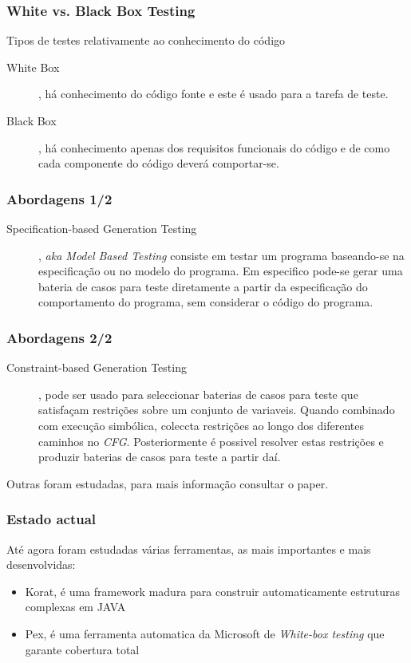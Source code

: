 \documentclass{beamer}
\begin{document}
\begin{frame}\frametitle{White vs. Black Box Testing}
\begin{block}{Tipos de testes relativamente ao conhecimento do código}
\begin{description}
\item[White Box], há conhecimento do código fonte e este é usado para a tarefa de teste.
\item[Black Box], há conhecimento apenas dos requisitos funcionais do código e de como cada componente do código deverá comportar-se.
\end{description}
\end{block}
\end{frame}

\begin{frame}\frametitle{Abordagens 1/2}
\begin{description}
\item[Specification-based Generation Testing], \textit{aka Model Based Testing} consiste em testar um programa baseando-se na especificação ou no modelo do programa.
Em especifico pode-se gerar uma bateria de casos para teste diretamente a partir da especificação do comportamento do programa, sem considerar o código do programa.
\end{description}
\end{frame}

\begin{frame}\frametitle{Abordagens 2/2}
\begin{description}
\item[Constraint-based Generation Testing], pode ser usado para seleccionar baterias de casos para teste que satisfaçam restrições sobre um conjunto de variaveis.
Quando combinado com execução simbólica, coleccta restrições ao longo dos diferentes caminhos no \textit{CFG}.
Posteriormente é possivel resolver estas restrições e produzir baterias de casos para teste a partir daí.
\end{description}
Outras foram estudadas, para mais informação consultar o paper.
\end{frame}

\begin{frame}\frametitle{Estado actual}
Até agora foram estudadas várias ferramentas, as mais importantes e mais desenvolvidas:
\begin{itemize}
\item Korat, é uma framework madura para construir automaticamente estruturas complexas em JAVA
\item Pex, é uma ferramenta automatica da Microsoft de \textit{White-box testing} que garante cobertura total
\end{itemize}
\end{frame}
\end{document}
